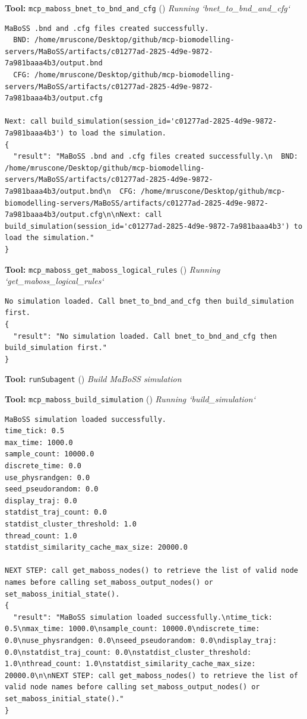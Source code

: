\documentclass[11pt,a4paper]{article}
\begin{document}
\begin{toolokbox}
\textbf{Tool:} \texttt{mcp\_maboss\_bnet\_to\_bnd\_and\_cfg} (\checkmark)
\textit{Running `bnet\_to\_bnd\_and\_cfg`}
\begin{lstlisting}
MaBoSS .bnd and .cfg files created successfully.
  BND: /home/mruscone/Desktop/github/mcp-biomodelling-servers/MaBoSS/artifacts/c01277ad-2825-4d9e-9872-7a981baaa4b3/output.bnd
  CFG: /home/mruscone/Desktop/github/mcp-biomodelling-servers/MaBoSS/artifacts/c01277ad-2825-4d9e-9872-7a981baaa4b3/output.cfg

Next: call build_simulation(session_id='c01277ad-2825-4d9e-9872-7a981baaa4b3') to load the simulation.
{
  "result": "MaBoSS .bnd and .cfg files created successfully.\n  BND: /home/mruscone/Desktop/github/mcp-biomodelling-servers/MaBoSS/artifacts/c01277ad-2825-4d9e-9872-7a981baaa4b3/output.bnd\n  CFG: /home/mruscone/Desktop/github/mcp-biomodelling-servers/MaBoSS/artifacts/c01277ad-2825-4d9e-9872-7a981baaa4b3/output.cfg\n\nNext: call build_simulation(session_id='c01277ad-2825-4d9e-9872-7a981baaa4b3') to load the simulation."
}
\end{lstlisting}
\end{toolokbox}
\begin{toolokbox}
\textbf{Tool:} \texttt{mcp\_maboss\_get\_maboss\_logical\_rules} (\checkmark)
\textit{Running `get\_maboss\_logical\_rules`}
\begin{lstlisting}
No simulation loaded. Call bnet_to_bnd_and_cfg then build_simulation first.
{
  "result": "No simulation loaded. Call bnet_to_bnd_and_cfg then build_simulation first."
}
\end{lstlisting}
\end{toolokbox}
\begin{toolokbox}
\textbf{Tool:} \texttt{runSubagent} (\checkmark)
\textit{Build MaBoSS simulation}
\end{toolokbox}
\begin{toolokbox}
\textbf{Tool:} \texttt{mcp\_maboss\_build\_simulation} (\checkmark)
\textit{Running `build\_simulation`}
\begin{lstlisting}
MaBoSS simulation loaded successfully.
time_tick: 0.5
max_time: 1000.0
sample_count: 10000.0
discrete_time: 0.0
use_physrandgen: 0.0
seed_pseudorandom: 0.0
display_traj: 0.0
statdist_traj_count: 0.0
statdist_cluster_threshold: 1.0
thread_count: 1.0
statdist_similarity_cache_max_size: 20000.0

NEXT STEP: call get_maboss_nodes() to retrieve the list of valid node names before calling set_maboss_output_nodes() or set_maboss_initial_state().
{
  "result": "MaBoSS simulation loaded successfully.\ntime_tick: 0.5\nmax_time: 1000.0\nsample_count: 10000.0\ndiscrete_time: 0.0\nuse_physrandgen: 0.0\nseed_pseudorandom: 0.0\ndisplay_traj: 0.0\nstatdist_traj_count: 0.0\nstatdist_cluster_threshold: 1.0\nthread_count: 1.0\nstatdist_similarity_cache_max_size: 20000.0\n\nNEXT STEP: call get_maboss_nodes() to retrieve the list of valid node names before calling set_maboss_output_nodes() or set_maboss_initial_state()."
}
\end{lstlisting}
\end{toolokbox}
\end{document}
